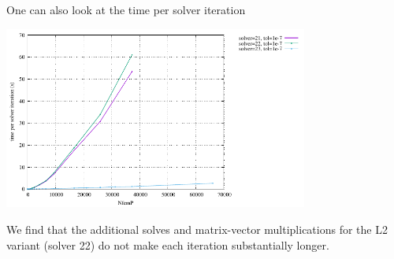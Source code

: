 One can also look at the time per solver iteration
\begin{center}
\includegraphics[width=10cm]{python_codes/fieldstone_147/RESULTS/L2/uzawa3/time_per_iteration.pdf}
\end{center}
We find that the additional solves and matrix-vector multiplications for the L2 variant (solver 22)
do not make each iteration substantially longer.

